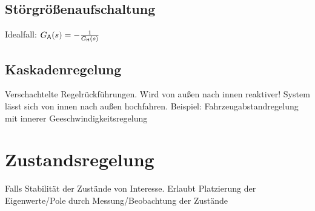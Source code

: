 \documentclass[fs, footer]{latex4ei}
\begin{document}
\begin{multicols*}{4}
{	\subsection{Störgrößenaufschaltung}
	Idealfall: $G_{\sf A}(s) = - \frac{1}{G_{\sf H}(s)}$
	
	\subsection{Kaskadenregelung}
	Verschachtelte Regelrückführungen. Wird von außen nach innen reaktiver!
	System lässt sich von innen nach außen hochfahren.
	Beispiel: Fahrzeugabstandregelung mit innerer Geeschwindigkeitsregelung
}

\columnbreak
\section{Zustandsregelung}
Falls Stabilität der Zustände von Interesse.
Erlaubt Platzierung der Eigenwerte/Pole durch Messung/Beobachtung der Zustände \\

\end{multicols*}
\end{document}
